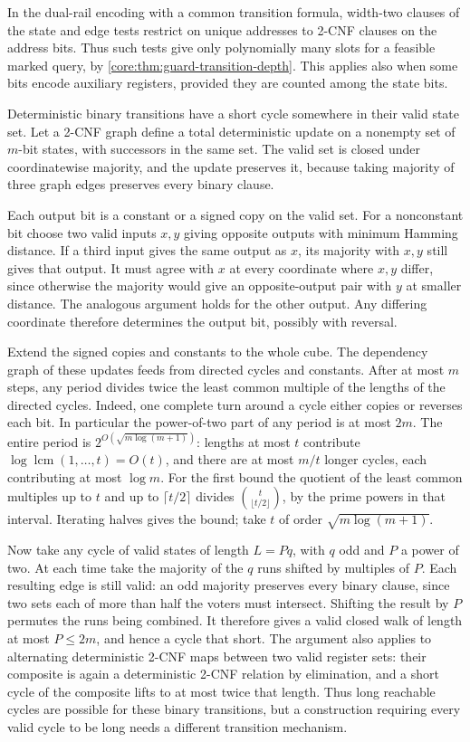 In the dual-rail encoding with a common transition formula,
width-two clauses of the state and edge tests restrict on unique
addresses to 2-CNF clauses on the address bits. Thus such tests
give only polynomially many slots for a feasible marked query,
by \cref{core:thm:guard-transition-depth}. This applies also
when some bits encode auxiliary registers, provided they are
counted among the state bits.

Deterministic binary transitions have a short
cycle somewhere in their valid state set. Let a
2-CNF graph define a total deterministic update
on a nonempty set of $m$-bit states, with successors
in the same set. The valid set is closed under
coordinatewise majority, and the update preserves
it, because taking majority of three graph edges
preserves every binary clause.

Each output bit is a constant or a signed copy
on the valid set. For a nonconstant bit choose two
valid inputs $x,y$ giving opposite outputs with
minimum Hamming distance. If a third input gives
the same output as $x$, its majority with $x,y$
still gives that output. It must agree with $x$ at
every coordinate where $x,y$ differ, since otherwise
the majority would give an opposite-output pair
with $y$ at smaller distance. The analogous
argument holds for the other output. Any differing
coordinate therefore determines the output bit,
possibly with reversal.

Extend the signed copies and constants to the
whole cube. The dependency graph of these updates
feeds from directed cycles and constants. After at
most $m$ steps, any period divides twice the least
common multiple of the lengths of the directed
cycles. Indeed, one complete turn around a cycle
either copies or reverses each bit. In particular
the power-of-two part of any period is at most
$2m$. The entire period is
$2^{O(\sqrt{m\log(m+1)})}$: lengths at most $t$
contribute $\log\operatorname{lcm}(1,\ldots,t)=O(t)$,
and there are at most $m/t$ longer cycles, each
contributing at most $\log m$. For the first bound
the quotient of the least common multiples up to
$t$ and up to $\lceil t/2\rceil$ divides
$\binom{t}{\lfloor t/2\rfloor}$, by the prime powers
in that interval. Iterating halves gives the bound;
take $t$ of order $\sqrt{m\log(m+1)}$.

Now take any cycle of valid states of length
$L=Pq$, with $q$ odd and $P$ a power of two.
At each time take the majority of the $q$ runs
shifted by multiples of $P$. Each resulting edge
is still valid: an odd majority preserves every
binary clause, since two sets each of more than
half the voters must intersect. Shifting the
result by $P$ permutes the runs being combined.
It therefore gives a valid closed walk of length
at most $P\le2m$, and hence a cycle that short.
The argument also applies to alternating
deterministic 2-CNF maps between two valid
register sets: their composite is again a
deterministic 2-CNF relation by elimination,
and a short cycle of the composite lifts to
at most twice that length. Thus long reachable
cycles are possible for these binary transitions,
but a construction requiring every valid cycle
to be long needs a different transition mechanism.

